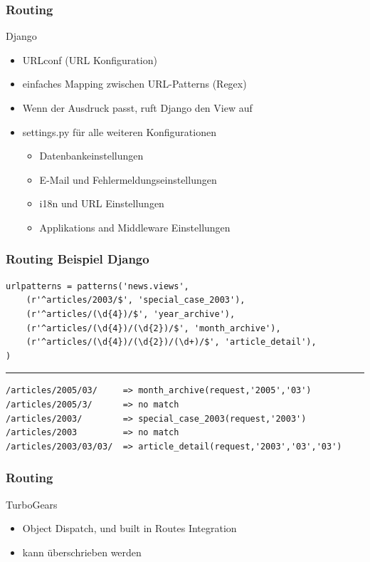 \documentclass[
    t,
    smaller,
    compress,
    xcolor=svgnames,            %
    table,
]{beamer}
\begin{document}
\begin{frame}
  \frametitle{Routing}
    Django
    \begin{itemize}[<1->]
        \item URLconf (URL Konfiguration)
        \item einfaches Mapping zwischen URL-Patterns (Regex)
        \item Wenn der Ausdruck passt, ruft Django den View auf
        \item settings.py für alle weiteren Konfigurationen
        \begin{itemize}[<1->]
            \item Datenbankeinstellungen
            \item E-Mail und Fehlermeldungseinstellungen
            \item i18n und URL Einstellungen
            \item Applikations and Middleware Einstellungen
        \end{itemize}
     \end{itemize}

\end{frame}

\begin{frame}[fragile]
\frametitle{Routing Beispiel Django}
\begin{lstlisting}
urlpatterns = patterns('news.views',
    (r'^articles/2003/$', 'special_case_2003'),
    (r'^articles/(\d{4})/$', 'year_archive'),
    (r'^articles/(\d{4})/(\d{2})/$', 'month_archive'),
    (r'^articles/(\d{4})/(\d{2})/(\d+)/$', 'article_detail'),
)
\end{lstlisting}
\hrule
\begin{lstlisting}
/articles/2005/03/     => month_archive(request,'2005','03')
/articles/2005/3/      => no match
/articles/2003/        => special_case_2003(request,'2003')
/articles/2003         => no match
/articles/2003/03/03/  => article_detail(request,'2003','03','03')
    \end{lstlisting}
\end{frame}


\begin{frame}
  \frametitle{Routing}
TurboGears
     \begin{itemize}[<1->]
        \item Object Dispatch, und built in Routes Integration
        \item kann überschrieben werden
    \end{itemize}
\end{frame}
\end{document}
